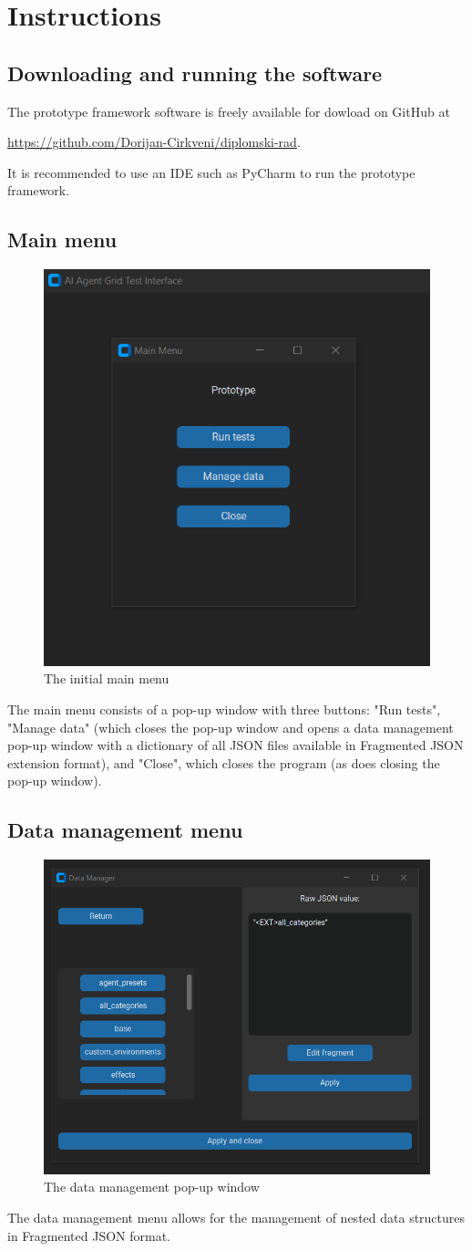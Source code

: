 \documentclass[masterthesis]{fer}
\begin{document}
\section{Instructions}
\subsection{Downloading and running the software}
The prototype framework software is freely available for dowload on GitHub at

\href{https://github.com/Dorijan-Cirkveni/diplomski-rad}{https://github.com/Dorijan-Cirkveni/diplomski-rad}.

It is recommended to use an IDE such as PyCharm to run the prototype framework.
\subsection{Main menu}
\begin{figure}[htb]
  \centering
  \includegraphics[width=0.5\linewidth]{Figures/thesis main menu.png} 
  \caption{The initial main menu}
  \label{slk:thesis_main_menu}
\end{figure}
The main menu consists of a pop-up window with three buttons: "Run tests", "Manage data" (which closes the pop-up window and opens a data management pop-up window with a dictionary of all JSON files available in Fragmented JSON extension format), and "Close", which closes the program (as does closing the pop-up window).

\subsection{Data management menu}
\begin{figure}[htb]
  \centering
  \includegraphics[width=0.5\linewidth]{Figures/thesis data management.png} 
  \caption{The data management pop-up window}
  \label{slk:thesis_data_management}
\end{figure}
The data management menu allows for the management of nested data structures in Fragmented JSON format.
\end{document}
